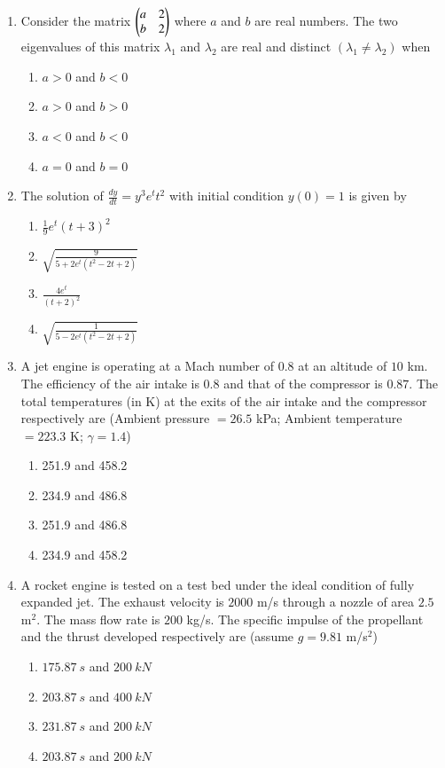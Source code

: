 \documentclass{article}
\begin{document}
\begin{enumerate}
\item Consider the matrix $\begin{pmatrix}a & 2 \\ b & 2\end{pmatrix}$ where $a$ and $b$ are real numbers. The two eigenvalues of this matrix $\lambda_1$ and $\lambda_2$ are real and distinct $(\lambda_1\neq\lambda_2)$ when
\begin{multicols}{4}
\begin{enumerate}
\item $a>0$ and $b<0$
\item $a>0$ and $b>0$
\item $a<0$ and $b<0$
\item $a=0$ and $b=0$
\end{enumerate}
\end{multicols}

\item The solution of $\frac{dy}{dt}=y^3e^tt^2$ with initial condition $y(0)=1$ is given by
\begin{multicols}{2}
\begin{enumerate}
\item $\frac{1}{9}e^t(t+3)^2$
\item $\sqrt{\frac{9}{5 + 2e^t(t^2 - 2t + 2)}}$
\item $\frac{4e^t}{(t + 2)^2}$
\item $\sqrt{\frac{1}{5 - 2e^t(t^2 - 2t + 2)}}$
\end{enumerate}
\end{multicols}

\item A jet engine is operating at a Mach number of $0.8$ at an altitude of $10$ km. The efficiency of the air intake is $0.8$ and that of the compressor is $0.87$. The total temperatures (in K) at the exits of the air intake and the compressor respectively are (Ambient pressure $=26.5$ kPa; Ambient temperature $=223.3$ K; $\gamma=1.4$)
\begin{multicols}{4}
\begin{enumerate}
\item 251.9 and 458.2
\item 234.9 and 486.8
\item 251.9 and 486.8
\item 234.9 and 458.2
\end{enumerate}
\end{multicols}

\item A rocket engine is tested on a test bed under the ideal condition of fully expanded jet. The exhaust velocity is $2000$ m/s through a nozzle of area $2.5$ m$^2$. The mass flow rate is $200$ kg/s. The specific impulse of the propellant and the thrust developed respectively are (assume $g=9.81$ m/s$^2$)
\begin{multicols}{2}
\begin{enumerate}
\item $175.87\ s$ and $200\ kN$
\item $203.87\ s$ and $400\ kN$
\item $231.87\ s$ and $200\ kN$
\item $203.87\ s$ and $200\ kN$
\end{enumerate}
\end{multicols}


\end{enumerate}
\end{document}
